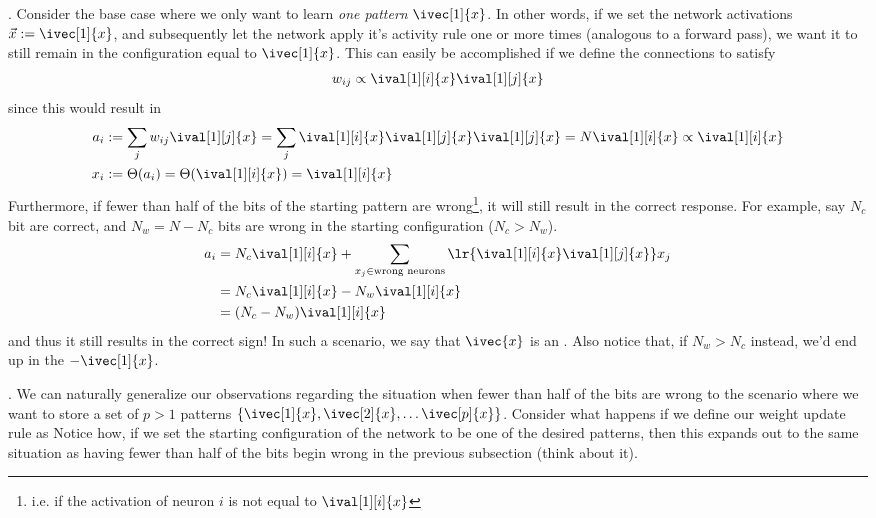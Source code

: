 \documentclass[11pt]{article}
\begin{document}
. Consider the base case where we only want to learn \textit{one pattern} $\ivec[1]{x}$. In other words, if we set the network activations $\vec x := \ivec[1]{x}$, and subsequently let the network apply it's activity rule one or more times (analogous to a forward pass), we want it to still remain in the configuration equal to $\ivec[1]{x}$. This can easily be accomplished if we define the connections to satisfy
\begin{align}
	w_{ij} \propto \ival[1][i]{x} \ival[1][j]{x}
\end{align}
since this would result in 
\begin{align}
	a_i &:= \sum_j w_{ij} \ival[1][j]{x} = \sum_j  \ival[1][i]{x} \ival[1][j]{x} \ival[1][j]{x} =  N  \ival[1][i]{x} \propto   \ival[1][i]{x} \\ 
	x_i &:= \Theta(a_i) = \Theta( \ival[1][i]{x}) =  \ival[1][i]{x} 
\end{align}
Furthermore, if fewer than half of the bits of the starting pattern are wrong\footnote{i.e. if the activation of neuron $i$ is not equal to $ \ival[1][i]{x}$}, it will still result in the correct response. For example, say $N_{c}$ bit are correct, and $N_{w} = N - N_{c}$ bits are wrong in the starting configuration ($N_c > N_w$). 
\begin{align}
	a_i &= N_{c}  \ival[1][i]{x} + \sum_{x_j \in \text{wrong neurons}} \lr{ \ival[1][i]{x} \ival[1][j]{x} } x_j \\
		&= N_c  \ival[1][i]{x} - N_w  \ival[1][i]{x} \\
		&= (N_c - N_w)  \ival[1][i]{x}
\end{align}
and thus it still results in the correct sign! In such a scenario, we say that $ \ivec{x}$ is an . Also notice that, if $N_w > N_c$ instead, we'd end up in the  $ -\ivec[1]{x}$. 

. We can naturally generalize our observations regarding the situation when fewer than half of the bits are wrong to the scenario where we want to store a set of $p > 1$ patterns $\{ \ivec[1]{x}, \ivec[2]{x}, \ldots \ivec[p]{x}\}$. Consider what happens if we define our weight update rule as 
Notice how, if we set the starting configuration of the network to be one of the desired patterns, then this expands out to the same situation as having fewer than half of the bits begin wrong in the previous subsection (think about it). 
\end{document}
